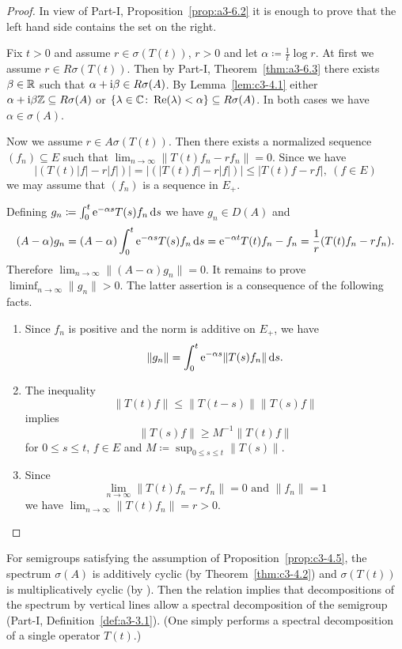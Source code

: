 \begin{proof}
In view of Part-I, Proposition~\ref{prop:a3-6.2} it is enough to prove that the left hand
side contains the set on the right.

Fix $t > 0$ and assume $r \in \sigma(T(t))$, $r > 0$ and let $\alpha \coloneq \frac{1}{t} \log r$.
At first we assume $r \in R\sigma(T(t))$.
Then by Part-I, Theorem~\ref{thm:a3-6.3} there exists
$\beta \in \mathbb{R} $ such that $\alpha+\mathrm{i}\beta \in R\sigma(A)$.
By Lemma~\ref{lem:c3-4.1} either $\alpha+\mathrm{i}\beta\mathbb{Z} \subseteq R\sigma(A)$
or $\{\lambda \in \mathbb{C}  \colon \mathop{}\!\mathrm{Re}(\lambda) < \alpha\} \subseteq R\sigma(A)$.
In both cases we have $\alpha \in \sigma(A)$.

Now we assume $r \in A\sigma(T(t))$. 
Then there exists a normalized sequence
$(f_n) \subseteq E$ such that $\lim_{n \to \infty}\|T(t)f_n - rf_n\| = 0$.
Since we have
\[
|(T(t)|f| - r|f|)| = |(|T(t)f| - r|f|)| \leq |T(t)f - rf|, \  (f \in E) 
\]
we may assume that $(f_n)$ is a sequence in $E_+$.

Defining $g_n \coloneq \int_{0}^{t} \mathrm{e}^{-\alpha s}T(s)f_n \mathop{}\!\mathrm{d}{s} $ we have $g_n \in D(A)$ and
\[
(A-\alpha)g_n = (A-\alpha)\int_{0}^{t} \mathrm{e}^{-\alpha s}T(s)f_n \mathop{}\!\mathrm{d}{s} = \mathrm{e}^{-\alpha t}T(t)f_n - f_n = \frac{1}{r}(T(t)f_n - rf_n) .
\]
Therefore $\lim_{n \to \infty}\|(A - \alpha) g_n\| = 0$.  It remains to prove 
$\liminf_{n \to \infty}\|g_n\| > 0$. 
The latter assertion is a consequence of the following facts.
\begin{enumerate}[\upshape (i),wide, labelindent=.25em]

\item
Since $f_n$ is positive and the norm is additive on $E_+$,
we have
\[
    \|g_n\| = \int_{0}^{t} \mathrm{e}^{-\alpha s}\|T(s)f_n\| \mathop{}\!\mathrm{d}{s} .
\]

\item 
The inequality 
\[
    \|T(t)f\| \leq \|T(t-s)\|\|T(s)f\|
\]
implies
\[
    	\|T(s)f\| \geq M^{-1}\|T(t)f\|
\]
for  $0 \leq s \leq t$, $f \in E$ and $ M \coloneq \sup_{ 0 \leq s \leq t} \|T(s)\|$.
    
    
\item 
Since 
\[
\lim_{n \to \infty} \|T(t)f_{n} - rf_{n}\| = 0 \text{ and $\|f_n\| = 1$}
\]
we have
$\lim_{n \to \infty}\|T(t)f_n\| = r > 0$.
\qedhere
\end{enumerate}
\end{proof}
For semigroups satisfying the assumption of Proposition~\ref{prop:c3-4.5}, the spectrum $\sigma(A)$ is additively cyclic (by Theorem~\ref{thm:c3-4.2}) and $\sigma(T(t))$ is multiplicatively cyclic
(by \textcite[V.Theorem~4.4]{schaefer:1974}). 
Then the relation  implies that
decompositions of the spectrum by vertical lines allow a spectral decomposition%
 of the semigroup (\cf Part-I, Definition~\ref{def:a3-3.1}). (One simply performs a spectral decomposition of a single operator $T(t)$.) 

